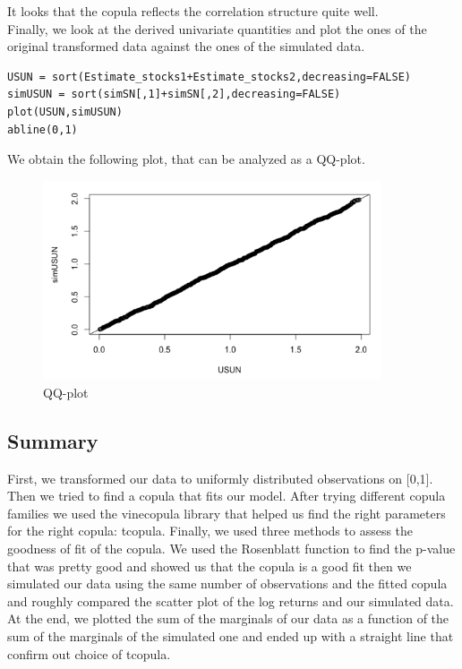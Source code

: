 \documentclass[11pt]{article}
\begin{document}
It looks that the copula reflects the correlation structure quite well.\\
Finally, we look at the derived univariate quantities and plot the ones of the original transformed data against the ones of the simulated data.
\begin{lstlisting}
USUN = sort(Estimate_stocks1+Estimate_stocks2,decreasing=FALSE)
simUSUN = sort(simSN[,1]+simSN[,2],decreasing=FALSE)
plot(USUN,simUSUN)
abline(0,1)
\end{lstlisting}
We obtain the following plot, that can be analyzed as a QQ-plot.
\begin{figure}[!ht]
 \center
  \includegraphics[width=100mm]{QQ-plot}
  \caption{QQ-plot}
  \label{fig:plot data}
\end{figure}

\subsection*{Summary}

First, we transformed our data to uniformly distributed observations on [0,1].
Then we tried to find a copula that fits our model. After trying different copula families we used the vinecopula library that helped us find the right parameters for the right copula: tcopula.
Finally, we used three methods to assess the goodness of fit of the copula. We used the Rosenblatt function to find the p-value that was pretty good and showed us that the copula is a good fit then we simulated our data using the same number of observations and the fitted copula and roughly compared the scatter plot of the log returns and our simulated data.
At the end, we plotted the sum of the marginals of our data
as a function of the sum of the marginals of the simulated one and ended up with a straight line that confirm out choice of tcopula.
\end{document}
